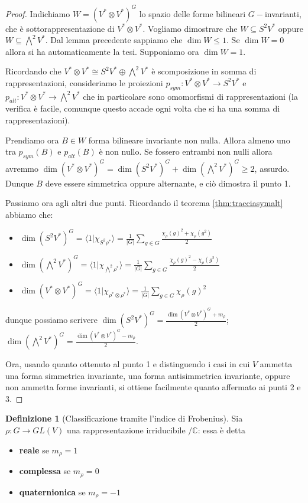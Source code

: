 \documentclass[11pt]{article}
\theoremstyle{plain}
\theoremstyle{definition}
\newtheorem{defn}{Definizione}[section]
\theoremstyle{remark}
\newcommand{\C}{\mathbb{C}}
\newcommand{\dsum}{\displaystyle\sum}
\begin{document}
\begin{proof}
Indichiamo $W = (V^*\otimes V^*)^G$ lo spazio delle forme bilineari $G-$invarianti, che è sottorappresentazione di $V^*\otimes V^*$.
Vogliamo dimostrare che $W\subseteq S^2V^*$ oppure $W\subseteq \bigwedge^2V^*$.
Dal lemma precedente sappiamo che $\dim W \le 1$. Se $\dim W = 0$ allora si ha automaticamente la tesi.
Supponiamo ora $\dim W = 1$.

Ricordando che $V^*\otimes V^* \cong S^2V^* \oplus \bigwedge^2V^*$ è scomposizione in somma di rappresentazioni,
consideriamo le proiezioni $p_{sym}:V^*\otimes V^* \to S^2V^*$ e $p_{alt}:V^*\otimes V^* \to \bigwedge^2V^*$
che in particolare sono omomorfismi di rappresentazioni (la verifica è facile, comunque questo accade ogni volta che si ha una somma di rappresentazioni).

Prendiamo ora $B\in W$ forma bilineare invariante non nulla. Allora almeno uno tra $p_{sym}(B)$ e $p_{alt}(B)$ è non nullo. Se fossero entrambi non nulli allora avremmo $\dim (V^*\otimes V^*)^G = \dim(S^2V^*)^G + \dim(\bigwedge^2V^*)^G \ge 2$, assurdo.
Dunque $B$ deve essere simmetrica oppure alternante, e ciò dimostra il punto 1.

Passiamo ora agli altri due punti. Ricordando il teorema \ref{thm:tracciasymalt} abbiamo che:
\begin{itemize}
\item $\dim(S^2V^*)^G = \langle 1|\chi_{S^2\rho^*}\rangle = \frac{1}{|G|}\dsum_{g\in G}\frac{\chi_\rho(g)^2 + \chi_\rho(g^2)}{2}$
\item $\dim(\bigwedge^2V^*)^G = \langle 1|\chi_{\bigwedge^2\rho^*}\rangle = \frac{1}{|G|}\dsum_{g\in G}\frac{\chi_\rho(g)^2 - \chi_\rho(g^2)}{2}$
\item $\dim(V^*\otimes V^*)^G = \langle 1|\chi_{\rho^*\otimes\rho^*}\rangle = \frac{1}{|G|}\dsum_{g\in G}\chi_\rho(g)^2$
\end{itemize}
dunque possiamo scrivere
$\dim(S^2V^*)^G = \frac{\dim(V^*\otimes V^*)^G + m_\rho}{2}$;\ \
$\dim(\bigwedge^2V^*)^G = \frac{\dim(V^*\otimes V^*)^G - m_\rho}{2}$.

Ora, usando quanto ottenuto al punto 1 e distinguendo i casi in cui $V$ ammetta una forma simmetrica invariante, una forma antisimmetrica invariante, oppure non ammetta forme invarianti, si ottiene facilmente quanto affermato ai punti 2 e 3.
\end{proof}

\begin{defn}[Classificazione tramite l'indice di Frobenius]
Sia $\rho:G\rightarrow GL(V)$ una rappresentazione irriducibile $/\C$: essa è detta
\begin{itemize}
\item \textbf{reale} se $m_\rho = 1$
\item \textbf{complessa} se $m_\rho = 0$
\item \textbf{quaternionica} se $m_\rho = -1$
\end{itemize}
\end{defn}
\end{document}

